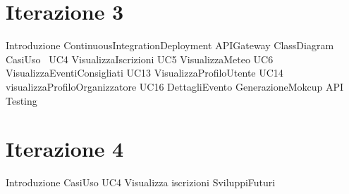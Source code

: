 \documentclass[a4paper, 12pt]{book}
\begin{document}
\chapter{Iterazione 3}
{Introduzione}
\clearpage
{ContinuousIntegrationDeployment}
\clearpage
{APIGateway}
\clearpage
{ClassDiagram}
\clearpage
{CasiUso}
\clearpage\
{UC4 VisualizzaIscrizioni}
\clearpage
{UC5 VisualizzaMeteo}
\clearpage
{UC6 VisualizzaEventiConsigliati}
\clearpage
{UC13 VisualizzaProfiloUtente}
\clearpage
{UC14 visualizzaProfiloOrganizzatore}
\clearpage
{UC16 DettagliEvento}
\clearpage
{GenerazioneMokcup}
\clearpage 
{API}
\clearpage
{Testing}
\clearpage

\chapter{Iterazione 4}
{Introduzione}
\clearpage
{CasiUso}
\clearpage
{UC4 Visualizza iscrizioni}
\clearpage
{SviluppiFuturi}
\clearpage
\end{document}
